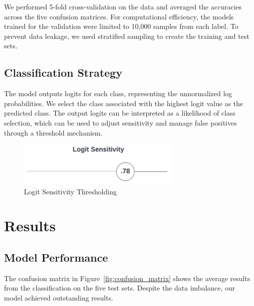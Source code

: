 \documentclass[12pt]{article}
\begin{document}
We performed 5-fold cross-validation on the data and averaged the accuracies across the five confusion matrices. For computational efficiency, the models trained for the validation were limited to 10,000 samples from each label. To prevent data leakage, we used stratified sampling to create the training and test sets.

\subsection{Classification Strategy}

The model outputs logits for each class, representing the unnormalized log probabilities. We select the class associated with the highest logit value as the predicted class. The output logits can be interpreted as a likelihood of class selection, which can be used to adjust sensitivity and manage false positives through a threshold mechanism.

\begin{figure}[htbp]
    \centering
    \includegraphics[width=0.7\textwidth]{logit_sensitivity.png}
    \caption{Logit Sensitivity Thresholding}
    \label{fig:logit_sensitivity}
\end{figure}

\section{Results}

\subsection{Model Performance}

The confusion matrix in Figure~\ref{fig:confusion_matrix} shows the average results from the classification on the five test sets. Despite the data imbalance, our model achieved outstanding results.
\end{document}
